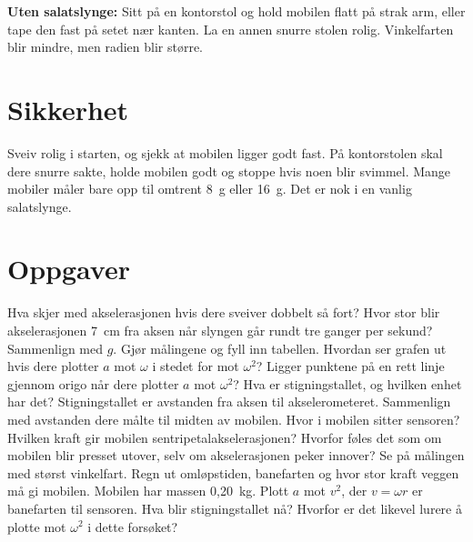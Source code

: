 \documentclass[11pt]{article}
\begin{document}
\textbf{Uten salatslynge:} Sitt på en kontorstol og hold mobilen flatt på strak arm, eller tape den fast på setet nær kanten. La en annen snurre stolen rolig. Vinkelfarten blir mindre, men radien blir større.

\section*{Sikkerhet}

Sveiv rolig i starten, og sjekk at mobilen ligger godt fast. På kontorstolen skal dere snurre sakte, holde mobilen godt og stoppe hvis noen blir svimmel. Mange mobiler måler bare opp til omtrent 8~g eller 16~g. Det er nok i en vanlig salatslynge.

\section*{Oppgaver}

\begin{oppgaveliste}
\oppgave {}Hva skjer med akselerasjonen hvis dere sveiver dobbelt så fort? Hvor stor blir akselerasjonen 7~cm fra aksen når slyngen går rundt tre ganger per sekund? Sammenlign med $g$.
\svar
\oppgave {}Gjør målingene og fyll inn tabellen. Hvordan ser grafen ut hvis dere plotter $a$ mot $ω$ i stedet for mot $ω^{2}$?
\svar
\oppgave {}Ligger punktene på en rett linje gjennom origo når dere plotter $a$ mot $ω^{2}$? Hva er stigningstallet, og hvilken enhet har det?
\svar
\oppgave {}Stigningstallet er avstanden fra aksen til akselerometeret. Sammenlign med avstanden dere målte til midten av mobilen. Hvor i mobilen sitter sensoren?
\svar
\oppgave {}Hvilken kraft gir mobilen sentripetalakselerasjonen? Hvorfor føles det som om mobilen blir presset utover, selv om akselerasjonen peker innover?
\svar
\oppgave {}Se på målingen med størst vinkelfart. Regn ut omløpstiden, banefarten og hvor stor kraft veggen må gi mobilen. Mobilen har massen 0,20~kg.
\svar
\oppgave {}Plott $a$ mot $v^{2}$, der $v = ωr$ er banefarten til sensoren. Hva blir stigningstallet nå? Hvorfor er det likevel lurere å plotte mot $ω^{2}$ i dette forsøket?
\svar
\end{oppgaveliste}
\end{document}
